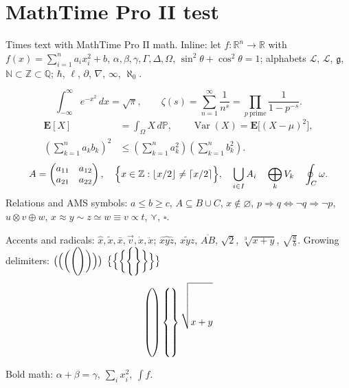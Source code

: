 \documentclass[11pt]{article}
\begin{document}
\section*{MathTime Pro II test}

Times text with MathTime Pro II math. Inline: let
$f\colon \mathbb{R}^n \to \mathbb{R}$ with
$f(x) = \sum_{i=1}^{n} a_i x_i^2 + b$, $\alpha,\beta,\gamma,\Gamma,\Delta,
\Omega$, $\sin^2\theta + \cos^2\theta = 1$; alphabets $\mathcal{L}$,
$\mathscr{L}$, $\mathfrak{g}$, $\mathbb{N}\subset\mathbb{Z}\subset\mathbb{Q}$;
$\hbar$, $\ell$, $\partial$, $\nabla$, $\infty$, $\aleph_0$.

\begin{equation}
  \int_{-\infty}^{\infty} e^{-x^2}\,dx = \sqrt{\pi},
  \qquad
  \zeta(s) = \sum_{n=1}^{\infty} \frac{1}{n^s}
           = \prod_{p\ \text{prime}} \frac{1}{1-p^{-s}} .
\end{equation}
\begin{align}
  \mathbf{E}[X] &= \int_\Omega X\,d\mathbb{P},\qquad
  \operatorname{Var}(X) = \mathbf{E}\bigl[(X-\mu)^2\bigr], \\
  \left( \sum_{k=1}^{n} a_k b_k \right)^{\!2}
  &\le \left(\sum_{k=1}^{n} a_k^2\right)\left(\sum_{k=1}^{n} b_k^2\right).
\end{align}
\[
  A = \begin{pmatrix} a_{11} & a_{12} \\ a_{21} & a_{22} \end{pmatrix},\quad
  \Bigl\{ x\in\mathbb{Z} : \lfloor x/2 \rfloor \ne \lceil x/2 \rceil \Bigr\},
  \quad \bigcup_{i\in I} A_i \quad \bigoplus_{k} V_k \quad \oint_C \omega .
\]
Relations and AMS symbols:
$a \leqslant b \geqslant c$, $A\subseteq B\cup C$, $x\notin\varnothing$,
$p\Rightarrow q \iff \neg q\Rightarrow\neg p$, $u\otimes v\oplus w$,
$x \approx y \sim z \simeq w \equiv v \propto t$, $\curlyvee$, $\square$.

Accents and radicals:
$\hat{x}, \tilde{x}, \bar{x}, \vec{v}, \dot{x}, \ddot{x}$;
$\widehat{xyz}$, $\widetilde{xyz}$, $\overline{AB}$, $\sqrt{2}$,
$\sqrt[3]{x+y}$, $\sqrt{\frac{a}{b}}$.
Growing delimiters:
$\bigl(\Bigl(\biggl(\Biggl( \Biggr)\biggr)\Bigr)\bigr)$
$\bigl\{\Bigl\{\biggl\{\Biggl\{ \Biggr\}\biggr\}\Bigr\}\bigr\}$
\[
  \left( \rule{0pt}{14mm} \right) \left\{ \rule{0pt}{14mm} \right\}
  \sqrt{\rule{0pt}{14mm}x+y}
\]

Bold math: {\boldmath $\alpha + \beta = \gamma,\ \sum_i x_i^2,\ \int f$}.
\end{document}
